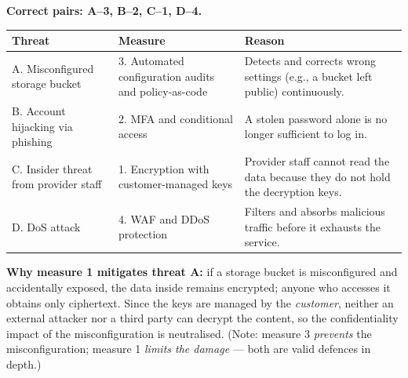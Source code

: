 \documentclass[11pt]{article}
\begin{document}
\begin{corrige}
\textbf{Correct pairs: A–3, B–2, C–1, D–4.}

\begin{center}
\begin{tabularx}{\linewidth}{|l|X|X|}\hline
\rowcolor{popblueL}\textbf{Threat} & \textbf{Measure} & \textbf{Reason} \\ \hline
A. Misconfigured storage bucket & 3. Automated configuration audits and policy-as-code & Detects and corrects wrong settings (e.g., a bucket left public) continuously. \\ \hline
B. Account hijacking via phishing & 2. MFA and conditional access & A stolen password alone is no longer sufficient to log in. \\ \hline
C. Insider threat from provider staff & 1. Encryption with customer-managed keys & Provider staff cannot read the data because they do not hold the decryption keys. \\ \hline
D. DoS attack & 4. WAF and DDoS protection & Filters and absorbs malicious traffic before it exhausts the service. \\ \hline
\end{tabularx}
\end{center}

\textbf{Why measure 1 mitigates threat A:} if a storage bucket is misconfigured and accidentally exposed, the data inside remains encrypted; anyone who accesses it obtains only ciphertext. Since the keys are managed by the \emph{customer}, neither an external attacker nor a third party can decrypt the content, so the confidentiality impact of the misconfiguration is neutralised. (Note: measure 3 \emph{prevents} the misconfiguration; measure 1 \emph{limits the damage} — both are valid defences in depth.)
\end{corrige}
\end{document}
